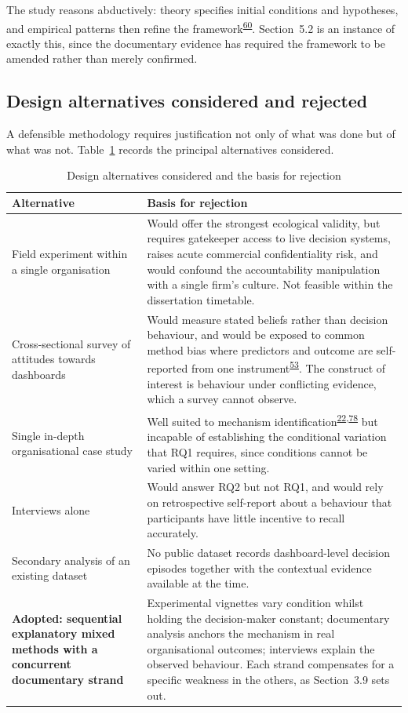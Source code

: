 \documentclass[11pt,a4paper]{article}
\numberwithin{figure}{section}
\numberwithin{table}{section}
\begin{document}
The study reasons abductively: theory specifies initial conditions and hypotheses, and empirical patterns
then refine the framework\textsuperscript{\hyperlink{ref60}{60}}. Section~5.2 is an instance of exactly this, since the
documentary evidence has required the framework to be amended rather than merely confirmed.

\subsection{Design alternatives considered and rejected}

A defensible methodology requires justification not only of what was done but of what was not.
Table~\ref{tab:alt} records the principal alternatives considered.

\begin{table}[H]
\centering\footnotesize
\caption{Design alternatives considered and the basis for rejection}
\label{tab:alt}
\begin{tabularx}{\textwidth}{@{}p{3.3cm} X@{}}
\toprule
\textbf{Alternative} & \textbf{Basis for rejection} \\
\midrule
Field experiment within a single organisation & Would offer the strongest ecological validity, but requires
gatekeeper access to live decision systems, raises acute commercial confidentiality risk, and would confound
the accountability manipulation with a single firm's culture. Not feasible within the dissertation
timetable. \\
Cross-sectional survey of attitudes towards dashboards & Would measure stated beliefs rather than decision
behaviour, and would be exposed to common method bias where predictors and outcome are self-reported from
one instrument\textsuperscript{\hyperlink{ref53}{53}}. The construct of interest is behaviour under conflicting evidence, which a
survey cannot observe. \\
Single in-depth organisational case study & Well suited to mechanism identification\textsuperscript{\hyperlink{ref22}{22},\hyperlink{ref78}{78}}
but incapable of establishing the conditional variation that RQ1 requires, since conditions cannot be
varied within one setting. \\
Interviews alone & Would answer RQ2 but not RQ1, and would rely on retrospective self-report about a
behaviour that participants have little incentive to recall accurately. \\
Secondary analysis of an existing dataset & No public dataset records dashboard-level decision episodes
together with the contextual evidence available at the time. \\
\midrule
\textbf{Adopted: sequential explanatory mixed methods with a concurrent documentary strand} & Experimental
vignettes vary condition whilst holding the decision-maker constant; documentary analysis anchors the
mechanism in real organisational outcomes; interviews explain the observed behaviour. Each strand
compensates for a specific weakness in the others, as Section~3.9 sets out. \\
\bottomrule
\end{tabularx}
\end{table}
\end{document}
